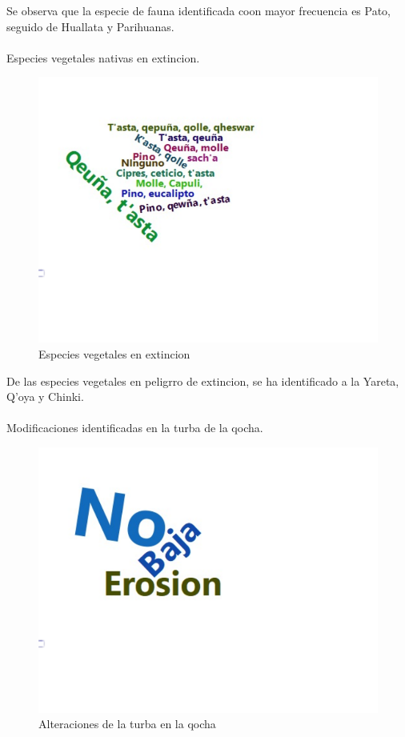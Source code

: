 \documentclass[12pt]{article}\usepackage[]{graphicx}\usepackage[]{xcolor}
\makeatletter
\def\maxwidth{ %
  \ifdim\Gin@nat@width>\linewidth
    \linewidth
  \else
    \Gin@nat@width
  \fi
}
\newenvironment{knitrout}{}{} %
\makeatother
\begin{document}
	Se observa que la especie de fauna identificada coon mayor frecuencia es Pato, seguido de Huallata y Parihuanas.\\
	\\
	Especies vegetales nativas en extincion.
	\begin{figure}[H]
	\centering
\begin{knitrout}
\color{fgcolor}
\includegraphics[width=\maxwidth]{figure/treintaytres-1} 
\end{knitrout}
	\caption{Especies vegetales en extincion}
	\end{figure}
	De las especies vegetales en peligrro de extincion, se ha identificado a la Yareta, Q'oya y Chinki.\\
	\\
	Modificaciones identificadas en la turba de la qocha.
	\begin{figure}[H]
	\centering
\begin{knitrout}
\color{fgcolor}
\includegraphics[width=\maxwidth]{figure/treintaycuatro-1} 
\end{knitrout}
	\caption{Alteraciones de la turba en la qocha}
	\end{figure}
\end{document}
